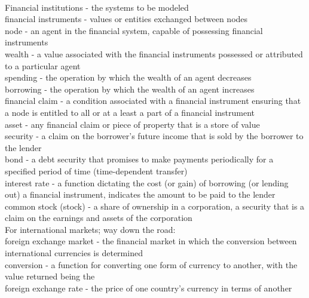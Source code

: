 \documentclass[12pt]{article}
\date{}
\begin{document}
 \\

 \noindent Financial institutions - the systems to be modeled \\

\noindent financial instruments - values or entities exchanged between nodes\\

\noindent node - an agent in the financial system, capable of possessing financial instruments\\

\noindent wealth - a value associated with the financial instruments possessed or attributed to a particular agent\\

\noindent spending - the operation by which the wealth of an agent decreases\\

\noindent borrowing - the operation by which the wealth of an agent increases\\

\noindent financial claim - a condition associated with a financial instrument ensuring that a node is entitled to all or at a least a part of a financial instrument\\

\noindent asset - any financial claim or piece of property that is a store of value\\

\noindent security -  a claim on the borrower's future income that is sold by the borrower to the lender\\

\noindent bond - a debt security that promises to make payments periodically for a specified period of time (time-dependent transfer)\\

\noindent interest rate - a function dictating the cost (or gain) of borrowing  (or lending out) a financial instrument, indicates the amount to be paid to the lender\\

\noindent common stock (stock) - a share of ownership in a corporation, a security that is a claim on the earnings and assets of the corporation\\

\noindent For international markets; way down the road:\\
\noindent foreign exchange market - the financial market in which the conversion between international currencies is determined \\
\noindent conversion - a function for converting one form of currency to another, with the value returned being the \\
\noindent foreign exchange rate - the price of one country's currency in terms of another\\
\end{document}
